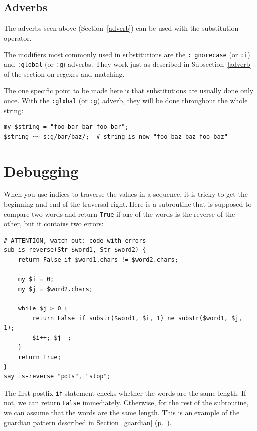 \subsection{Adverbs}
\label{regex_adverbs}

The adverbs seen above (Section~\ref{adverb}) can be used 
with the substitution operator. 

The modifiers most commonly used in substitutions are the 
{\tt :ignorecase} (or {\tt :i}) and {\tt :global} (or 
{\tt :g}) adverbs. They work just as described in 
Subsection~\ref{adverb} of the section on regexes 
and matching. 

The one specific point to be made here is that substitutions 
are usually done only once. With the {\tt :global} (or 
{\tt :g}) adverb, they will be done throughout the whole 
string:

\begin{verbatim}
my $string = "foo bar bar foo bar";
$string ~~ s:g/bar/baz/;  # string is now "foo baz baz foo baz"                    
\end{verbatim}
%


\section{Debugging}

When you use indices to traverse the values in a sequence,
it is tricky to get the beginning and end of the traversal
right.  Here is a subroutine that is supposed to compare two
words and return {\tt True} if one of the words is the reverse
of the other, but it contains two errors:

\begin{verbatim}
# ATTENTION, watch out: code with errors
sub is-reverse(Str $word1, Str $word2) {
    return False if $word1.chars != $word2.chars;
    
    my $i = 0;
    my $j = $word2.chars;

    while $j > 0 {
        return False if substr($word1, $i, 1) ne substr($word1, $j, 1);
        $i++; $j--;
    }
    return True;
}
say is-reverse "pots", "stop";

\end{verbatim}
%
The first postfix {\tt if} statement checks whether the words 
are the same length.  If not, we can return {\tt False} 
immediately. Otherwise, for the rest of the subroutine, 
we can assume that the words are the same length.  
This is an example of the guardian pattern described 
in Section~\ref{guardian} (p.~\pageref{guardian}).

